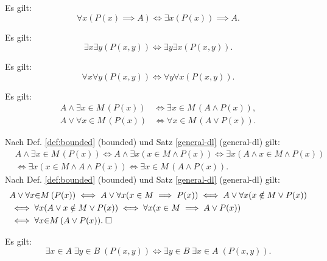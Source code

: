 \begin{Satz}\label{exists-implies-const}
Es gilt:
\[\forall x(P(x)\implies A) \iff \exists x(P(x))\implies A.\]
\end{Satz}

\begin{Satz}\label{exists-cl}
Es gilt:
\[\exists x\exists y(P(x,y)) \iff \exists y\exists x(P(x,y)).\]
\end{Satz}

\begin{Satz}\label{all-cl}
Es gilt:
\[\forall x\forall y(P(x,y)) \iff \forall y\forall x(P(x,y)).\]
\end{Satz}

\begin{Satz}%
\label{bounded-general-dl}
Es gilt:
\begin{align}
A\land \exists x{\in}M\,(P(x)) &\iff \exists x{\in}M\,(A\land P(x)),\\
A\lor \forall x{\in}M\,(P(x)) &\iff \forall x{\in}M\,(A\lor P(x)).
\end{align}
\end{Satz}

\begin{Beweis}
Nach Def. \ref{def:bounded} (bounded)
und Satz \ref{general-dl} (general-dl) gilt:
\begin{align*}
&A\land \exists x{\in}M\,(P(x))
\iff A\land\exists x(x\in M\land P(x))
\iff \exists x(A\land x\in M\land P(x))\\
&\iff \exists x(x\in M\land A\land P(x))
\iff \exists x{\in}M\,(A\land P(x)).
\end{align*}
Nach Def. \ref{def:bounded} (bounded)
und Satz \ref{general-dl} (general-dl) gilt:
\begin{align*}
& A\lor\forall x{\in}M\,(P(x))
\iff A\lor\forall x(x\in M\implies P(x))
\iff A\lor\forall x(x\notin M\lor P(x))\\
&\iff \forall x(A\lor x\notin M\lor P(x))
\iff \forall x(x\in M\implies A\lor P(x))\\
&\iff \forall x{\in}M\,(A\lor P(x)).\;\square
\end{align*}
\end{Beweis}

\begin{Satz}\label{bounded-exists-cl}
Es gilt:
\[\exists x{\in}A\;\exists y{\in}B\;(P(x,y))
\iff \exists y{\in}B\;\exists x{\in}A\;(P(x,y)).\]
\end{Satz}

